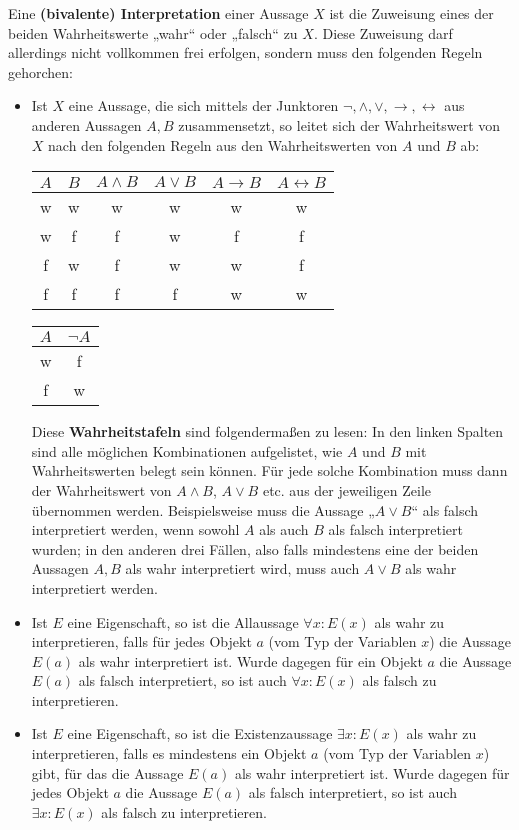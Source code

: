 \begin{defin}[Interpretation] \label{def:interpretation}  
    Eine \textbf{(bivalente) Interpretation} einer Aussage $X$ ist die Zuweisung eines der beiden Wahrheitswerte „wahr“ oder „falsch“ zu $X$. Diese Zuweisung darf allerdings nicht vollkommen frei erfolgen, sondern muss den folgenden Regeln gehorchen:
    \begin{itemize}
        \item  Ist $X$ eine Aussage, die sich mittels der Junktoren $\neg,\land,\lor,\to,\leftrightarrow$ aus anderen Aussagen $A,B$ zusammensetzt, so leitet sich der Wahrheitswert von $X$ nach den folgenden Regeln aus den Wahrheitswerten von $A$ und $B$ ab:
        \begin{center}
        \begin{tabular}{cc|cccc}
            $A$ & $B$  & $A\land B$ & $A\lor B$ & $A\to B$ & $A\leftrightarrow B$ \\
            \hline
            w&w& w & w & w & w \\
            w&f& f & w & f & f \\
            f&w& f & w & w & f \\
            f&f& f & f & w & w
        \end{tabular} \qquad\quad \begin{tabular}{c|c}
            $A$ & $\neg A$ \\
            \hline
            w& f \\
            f& w
        \end{tabular}
        \end{center}
        Diese \textbf{Wahrheitstafeln} sind folgendermaßen zu lesen: In den linken Spalten sind alle möglichen Kombinationen aufgelistet, wie $A$ und $B$ mit Wahrheitswerten belegt sein können. Für jede solche Kombination muss dann der Wahrheitswert von $A\land B$, $A\lor B$ etc. aus der jeweiligen Zeile übernommen werden. Beispielsweise muss die Aussage „$A\lor B$“ als falsch interpretiert werden, wenn sowohl $A$ als auch $B$ als falsch interpretiert wurden; in den anderen drei Fällen, also falls mindestens eine der beiden Aussagen $A,B$ als wahr interpretiert wird, muss auch $A\lor B$ als wahr interpretiert werden.
        \item Ist $E$ eine Eigenschaft, so ist die Allaussage $\forall x: E(x)$ als wahr zu interpretieren, falls für jedes Objekt $a$ (vom Typ der Variablen $x$) die Aussage $E(a)$ als wahr interpretiert ist. Wurde dagegen für ein Objekt $a$ die Aussage $E(a)$ als falsch interpretiert, so ist auch $\forall x: E(x)$ als falsch zu interpretieren.
        \item Ist $E$ eine Eigenschaft, so ist die Existenzaussage $\exists x: E(x)$ als wahr zu interpretieren, falls es mindestens ein Objekt $a$ (vom Typ der Variablen $x$) gibt, für das die Aussage $E(a)$ als wahr interpretiert ist. Wurde dagegen für jedes Objekt $a$ die Aussage $E(a)$ als falsch interpretiert, so ist auch $\exists x: E(x)$ als falsch zu interpretieren.
    \end{itemize}
\end{defin}


